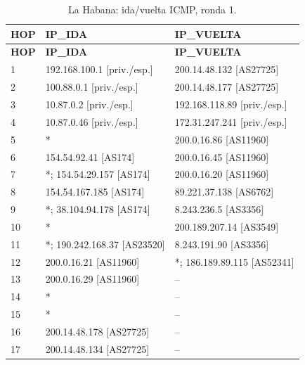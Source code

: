 \begin{longtable}{p{0.95cm}p{7.075cm}p{7.075cm}}
\caption{La Habana: ida/vuelta ICMP, ronda 1.}\label{anexo:vuelta:200.14.48.134:ICMP:1} \\
\toprule
\textbf{HOP} & \textbf{IP\_\allowbreak{}IDA} & \textbf{IP\_\allowbreak{}VUELTA} \\ \midrule
\endfirsthead
\toprule
\textbf{HOP} & \textbf{IP\_\allowbreak{}IDA} & \textbf{IP\_\allowbreak{}VUELTA} \\ \midrule
\endhead
1 & 192.168.100.1 [priv./esp.] & 200.14.48.132 [AS27725] \\
2 & 100.88.0.1 [priv./esp.] & 200.14.48.177 [AS27725] \\
3 & 10.87.0.2 [priv./esp.] & 192.168.118.89 [priv./esp.] \\
4 & 10.87.0.46 [priv./esp.] & 172.31.247.241 [priv./esp.] \\
5 & * & 200.0.16.86 [AS11960] \\
6 & 154.54.92.41 [AS174] & 200.0.16.45 [AS11960] \\
7 & *; 154.54.29.157 [AS174] & 200.0.16.20 [AS11960] \\
8 & 154.54.167.185 [AS174] & 89.221.37.138 [AS6762] \\
9 & *; 38.104.94.178 [AS174] & 8.243.236.5 [AS3356] \\
10 & * & 200.189.207.14 [AS3549] \\
11 & *; 190.242.168.37 [AS23520] & 8.243.191.90 [AS3356] \\
12 & 200.0.16.21 [AS11960] & *; 186.189.89.115 [AS52341] \\
13 & 200.0.16.29 [AS11960] & -- \\
14 & * & -- \\
15 & * & -- \\
16 & 200.14.48.178 [AS27725] & -- \\
17 & 200.14.48.134 [AS27725] & -- \\
\bottomrule
\end{longtable}
\endgroup
\begingroup
\fontsize{9}{11}\selectfont
